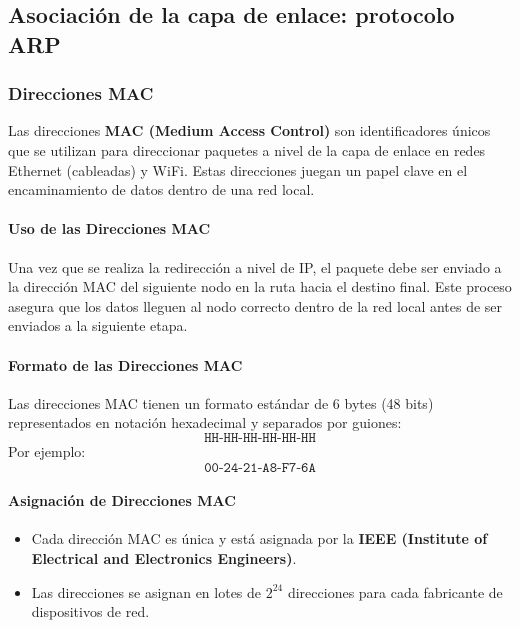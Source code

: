 \documentclass[a4paper,12pt]{article}
\begin{document}
    

\subsection{Asociación de la capa de enlace: protocolo ARP}


\subsubsection{Direcciones MAC}

Las direcciones \textbf{MAC (Medium Access Control)} son identificadores únicos que se utilizan para direccionar paquetes a nivel de la capa de enlace en redes Ethernet (cableadas) y WiFi. Estas direcciones juegan un papel clave en el encaminamiento de datos dentro de una red local.

\paragraph{Uso de las Direcciones MAC}

Una vez que se realiza la redirección a nivel de IP, el paquete debe ser enviado a la dirección MAC del siguiente nodo en la ruta hacia el destino final. Este proceso asegura que los datos lleguen al nodo correcto dentro de la red local antes de ser enviados a la siguiente etapa.

\paragraph{Formato de las Direcciones MAC}

Las direcciones MAC tienen un formato estándar de 6 bytes (48 bits) representados en notación hexadecimal y separados por guiones:
\[
\texttt{HH-HH-HH-HH-HH-HH}
\]
Por ejemplo:
\[
\texttt{00-24-21-A8-F7-6A}
\]

\paragraph{Asignación de Direcciones MAC}

\begin{itemize}
    \item Cada dirección MAC es única y está asignada por la \textbf{IEEE (Institute of Electrical and Electronics Engineers)}.
    \item Las direcciones se asignan en lotes de \(2^{24}\) direcciones para cada fabricante de dispositivos de red.
\end{itemize}
\end{document}
